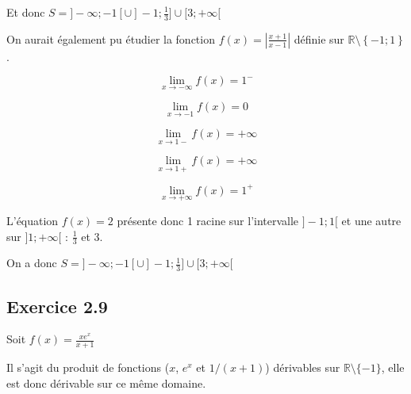 \documentclass[a4paper,10pt]{report}
\begin{document}
Et donc $S = ]-\infty ; -1[ \cup ]-1 ; \frac{1}{3}] \cup [3 ; +\infty[$


On aurait également pu étudier la fonction $f(x) = \left| \frac{x+1}{x-1} \right|$ définie sur $\mathbb{R} \setminus \left\lbrace -1 ; 1 \right\rbrace$.

\begin{displaymath}
	\lim_{x \rightarrow -\infty} f(x) = 1^{-}
\end{displaymath}

\begin{displaymath}
	\lim_{x \rightarrow -1} f(x) = 0
\end{displaymath}

\begin{displaymath}
	\lim_{x \rightarrow 1-} f(x) = +\infty
\end{displaymath}

\begin{displaymath}
	\lim_{x \rightarrow 1+} f(x) = +\infty
\end{displaymath}

\begin{displaymath}
	\lim_{x \rightarrow +\infty} f(x) = 1^{+}
\end{displaymath}


L'équation $f(x)=2$ présente donc 1 racine sur l'intervalle $]-1 ; 1[$ et une autre sur $]1; +\infty[$ : $\frac{1}{3}$ et $3$.

On a donc $S = ]-\infty ; -1[ \cup ]-1 ; \frac{1}{3}] \cup [3 ; +\infty[$

\subsection*{Exercice 2.9}

Soit $f(x) = \frac{xe^x}{x+1}$

Il s'agit du produit de fonctions ($x$, $e^x$ et $1/(x+1)$) dérivables sur $\mathbb{R}\setminus\{-1\}$,
elle est donc dérivable sur ce même domaine. 
\end{document}
